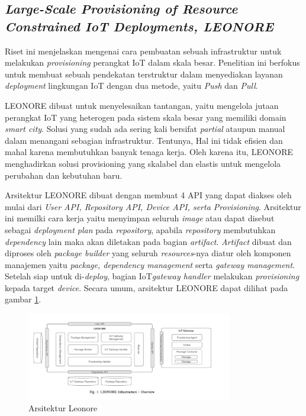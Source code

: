 \subsection{\textit{Large-Scale Provisioning of
    Resource Constrained
    IoT Deployments, LEONORE}}
\label{subsec:leonore}

Riset ini menjelaskan mengenai cara pembuatan sebuah infrastruktur untuk melakukan \textit{provisioning} perangkat IoT dalam skala besar. Penelitian ini berfokus untuk membuat sebuah pendekatan terstruktur dalam menyediakan layanan \textit{deployment} lingkungan IoT dengan dua metode, yaitu \textit{Push} dan \textit{Pull}.

LEONORE dibuat untuk menyelesaikan tantangan, yaitu mengelola jutaan perangkat IoT yang heterogen pada sistem skala besar yang memiliki domain \textit{smart city}. Solusi yang sudah ada sering kali bersifat \textit{partial} ataupun manual dalam menangani sebagian infrastruktur. Tentunya, Hal ini tidak efisien dan mahal karena membutuhkan banyak tenaga kerja. Oleh karena itu, LEONORE menghadirkan solusi provisioning yang skalabel dan elastis untuk mengelola perubahan dan kebutuhan baru.

Arsitektur LEONORE dibuat dengan membuat 4 API yang dapat diakses oleh mulai dari  \textit{User API, Repository API, Device API, serta Provisioning}. Arsitektur ini memilki cara kerja yaitu menyimpan seluruh \textit{image} atau dapat disebut sebagai \textit{deployment plan} pada \textit{repository}, apabila \textit{repository} membutuhkan \textit{dependency} lain maka akan diletakan pada bagian \textit{artifact}. \textit{Artifact} dibuat dan diproses oleh \textit{package builder} yang seluruh \textit{resources}-nya diatur oleh komponen manajemen yaitu \textit{package, dependency management} serta \textit{gateway management}. Setelah siap untuk di-\textit{deploy}, bagian IoT\textit{gateway handler} melakukan \textit{provisioning} kepada target \textit{device}. Secara umum, arsitektur LEONORE dapat dilihat pada gambar \ref{fig:arsitektur-leonore}.

\begin{figure}[ht]
  \centering
  \includegraphics[width=0.8\textwidth]{resources/chapter-2/arsitektur-leonore.jpg}
  \caption{Arsitektur Leonore \parencite{vogler2015leonore}}
  \label{fig:arsitektur-leonore}
\end{figure}

